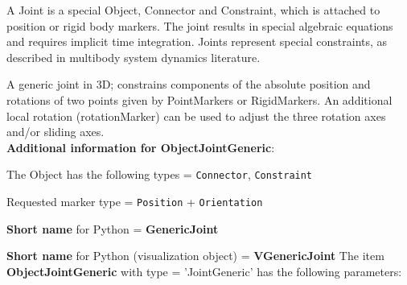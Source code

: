 %

\newpage
A Joint is a special Object, Connector and Constraint, which is attached to position or rigid body markers. The joint results in special algebraic equations and requires implicit time integration. Joints represent special constraints, as described in multibody system dynamics literature.

\label{sec:item:ObjectJointGeneric}
A generic joint in 3D; constrains components of the absolute position and rotations of two points given by PointMarkers or RigidMarkers. An additional local rotation (rotationMarker) can be used to adjust the three rotation axes and/or sliding axes.\vspace{12pt}
 \\{\bf Additional information for ObjectJointGeneric}:
\bi
  \item The Object has the following types = \texttt{Connector}, \texttt{Constraint}
  \item Requested marker type = \texttt{Position} + \texttt{Orientation}
  \item {\bf Short name} for Python = {\bf GenericJoint}  \item {\bf Short name} for Python (visualization object) = {\bf VGenericJoint}\ei
\vspace{12pt} \noindent The item {\bf ObjectJointGeneric} with type = 'JointGeneric' has the following parameters:\vspace{-1cm}\\ 
